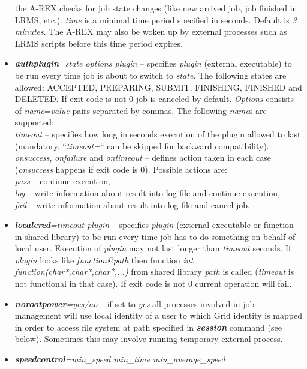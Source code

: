 \documentclass{article}                            %
\begin{document}
\begin{itemize}
the A-REX checks for job state changes (like new arrived job, job
finished in LRMS, etc.). \textit{time} is a minimal time period specified
in seconds. Default is \emph{3 minutes}. The A-REX may also be woken up by
external processes such as LRMS scripts before this time period expires.
\item \textbf{\textit{authplugin}}\textit{=state options plugin} -- specifies
\emph{plugin} (external executable) to be run every time job is about
to switch to \emph{state}. The following states are allowed: ACCEPTED,
PREPARING, SUBMIT, FINISHING, FINISHED and DELETED. If exit code is
not 0 job is canceled by default. \textit{Options} consists of \textit{name}=\textit{value}
pairs separated by commas. The following \textit{name}s are supported:\\
\textit{timeout} -- specifies how long in seconds execution of the
plugin allowed to last (mandatory, {}``\textit{timeout=}{}`` can
be skipped for backward compatibility).\\
\textit{onsuccess}, \textit{onfailure} and \textit{ontimeout} -- defines
action taken in each case (\textit{onsuccess} happens if exit code
is 0). Possible actions are:\\
\textit{pass} -- continue execution,\\
\textit{log} -- write information about result into log file and continue
execution,\\
\textit{fail} -- write information about result into log file and cancel
job.
\item \textbf{\textit{localcred}}\textit{=timeout plugin} -- specifies \emph{plugin}
(external executable or function in shared library) to be run every
time job has to do something on behalf of local user. Execution of
\emph{plugin} may not last longer than \emph{timeout} seconds. If
\emph{plugin} looks like \emph{function@path} then function \emph{int
function(char{*},char{*},char{*},...)} from shared library \emph{path}
is called (\emph{timeout} is not functional in that case). If exit
code is not 0 current operation will fail.
\item \textbf{\textit{norootpower}}\textit{=yes/no} -- if set to \emph{yes}
all processes involved in job management will use local identity of
a user to which Grid identity is mapped in order to access file system
at path specified in \textbf{\textit{session}} command (see below).
Sometimes this may involve running temporary external process.
\item \textbf{\textit{speedcontrol}}\textit{=min\_speed min\_time min\_average\_speed
}
\end{itemize}
\end{document}
